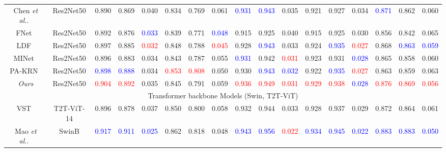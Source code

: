 \documentclass{llncs}
\makeatletter
\DeclareRobustCommand\onedot{\futurelet\@let@token\@onedot}
\def\@onedot{\ifx\@let@token.\else.\null\fi\xspace}
\def\etal{\emph{et al}\onedot}
\newcommand{\rowgray}{\rowcolor{gray!7}}
\makeatother
\begin{document}
\begin{table}
{\begin{tabular}{c|c|ccc|ccc|ccc|ccc|ccc}
            Chen \etal~\cite{chen2018reverse}         & Res2Net50 & 0.890 & 0.869 & 0.040 & 0.834 & 0.769 & 0.061 & \textcolor{blue}{0.931} & \textcolor{blue}{0.943} & 0.035 & 0.921 & 0.927 & 0.034 & \textcolor{blue}{0.871} & 0.862 & 0.060 \\ 
            FNet~\cite{wei2020f3net}       & Res2Net50 & 0.892 & 0.876 & \textcolor{blue}{0.033} & 0.839 & 0.771 & \textcolor{blue}{0.048} & 0.915 & 0.925 & 0.040 & 0.915 & 0.925 & 0.030 & 0.856 & 0.842 & 0.065 \\ 
            LDF~\cite{wei2020label}            & Res2Net50 & 0.897 & 0.885 & \textcolor{red}{0.032} & 0.848 & 0.788 & \textcolor{red}{0.045} & 0.928 & \textcolor{blue}{0.943} & 0.033 & 0.924 & \textcolor{blue}{0.935} & \textcolor{red}{0.027} & 0.868 & \textcolor{blue}{0.863} & \textcolor{blue}{0.059} \\ 
            MINet~\cite{pang2020multi}         & Res2Net50 & 0.896 & 0.883 & 0.034 & 0.843 & 0.787 & 0.055 & \textcolor{blue}{0.931} & 0.942 & \textcolor{red}{0.031} & 0.923 & 0.931 & \textcolor{blue}{0.028} & 0.865 & 0.858 & 0.060 \\ 
            PA-KRN~\cite{xu2021locate}         & Res2Net50 & \textcolor{blue}{0.898} & \textcolor{blue}{0.888} & 0.034 & \textcolor{red}{0.853} & \textcolor{red}{0.808} & 0.050 & 0.930 & \textcolor{blue}{0.943} & \textcolor{blue}{0.032} & 0.922 & \textcolor{blue}{0.935} & \textcolor{red}{0.027} & 0.863 & 0.859 & 0.063 \\ 
            \hline
            \rowgray
            \textit{Ours}                                & Res2Net50 & \textcolor{red}{0.904} & \textcolor{red}{0.892} & 0.035 & 0.845 & 0.791 & 0.059 & \textcolor{red}{0.936} & \textcolor{red}{0.949} & \textcolor{red}{0.031} & \textcolor{red}{0.929} & \textcolor{red}{0.938} & \textcolor{blue}{0.028} & \textcolor{red}{0.876} & \textcolor{red}{0.869} & \textcolor{red}{0.056} \\ 
            \hline \hline
            \multicolumn{17}{c}{Transformer backbone Models (Swin, T2T-ViT)} \\
            \hline\hline
            VST~\cite{liu2021visual}                     & T2T-ViT-14 & 0.896 & 0.878 & 0.037 & 0.850 & 0.800 & 0.058 & 0.932 & 0.944 & 0.033 & 0.928 & 0.937 & 0.029 & 0.872 & 0.864 & 0.061 \\ 
            Mao \etal~\cite{mao2021transformer}              & SwinB & \textcolor{blue}{0.917} & \textcolor{blue}{0.911} & \textcolor{blue}{0.025} & 0.862 & 0.818 & 0.048 & \textcolor{blue}{0.943} & \textcolor{blue}{0.956} & \textcolor{red}{0.022} & \textcolor{blue}{0.934} & \textcolor{blue}{0.945} & \textcolor{blue}{0.022} & \textcolor{blue}{0.883} & \textcolor{blue}{0.883} & \textcolor{blue}{0.050} \\ 

\end{tabular}}
\end{table}
\end{document}
